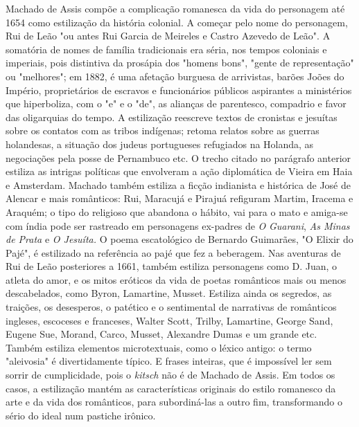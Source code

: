Machado de Assis compõe a complicação romanesca da vida do personagem
até 1654 como estilização da história colonial. A começar pelo nome do
personagem, Rui de Leão "ou antes Rui Garcia de Meireles e Castro
Azevedo de Leão". A somatória de nomes de família tradicionais era
séria, nos tempos coloniais e imperiais, pois distintiva da prosápia dos
"homens bons", "gente de representação" ou "melhores"; em 1882, é uma
afetação burguesa de arrivistas, barões Joões do Império, proprietários
de escravos e funcionários públicos aspirantes a ministérios que
hiperboliza, com o "e" e o "de", as alianças de parentesco, compadrio e
favor das oligarquias do tempo. A estilização reescreve textos de
cronistas e jesuítas sobre os contatos com as tribos indígenas; retoma
relatos sobre as guerras holandesas, a situação dos judeus portugueses
refugiados na Holanda, as negociações pela posse de Pernambuco etc. O
trecho citado no parágrafo anterior estiliza as intrigas políticas que
envolveram a ação diplomática de Vieira em Haia e Amsterdam. Machado
também estiliza a ficção indianista e histórica de José de Alencar e
mais românticos: Rui, Maracujá e Pirajuá refiguram Martim, Iracema e
Araquém; o tipo do religioso que abandona o hábito, vai para o mato e
amiga-se com índia pode ser rastreado em personagens ex-padres de
\emph{O} \emph{Guarani}, \emph{As Minas de Prata} e \emph{O Jesuíta.} O
poema escatológico de Bernardo Guimarães, "O Elixir do Pajé", é
estilizado na referência ao pajé que fez a beberagem. Nas aventuras de
Rui de Leão posteriores a 1661, também estiliza personagens como D.
Juan, o atleta do amor, e os mitos eróticos da vida de poetas românticos
mais ou menos descabelados, como Byron, Lamartine, Musset. Estiliza
ainda os segredos, as traições, os desesperos, o patético e o
sentimental de narrativas de românticos ingleses, escoceses e franceses,
Walter Scott, Trilby, Lamartine, George Sand, Eugene Sue, Morand, Carco,
Musset, Alexandre Dumas e um grande etc. Também estiliza elementos
microtextuais, como o léxico antigo: o termo "aleivosia" é
divertidamente típico. E frases inteiras, que é impossível ler sem
sorrir de cumplicidade, pois o \emph{kitsch} não é de Machado de Assis.
Em todos os casos, a estilização mantém as características originais do
estilo romanesco da arte e da vida dos românticos, para subordiná-las a
outro fim, transformando o sério do ideal num pastiche irônico.


